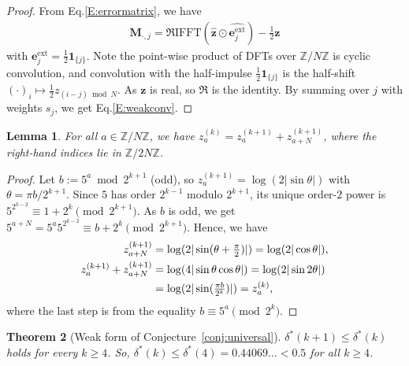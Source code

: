 \documentclass[11pt,a4paper]{article}
\theoremstyle{plain}
\newtheorem{theorem}{Theorem}[section]
\newtheorem{lemma}[theorem]{Lemma}
\theoremstyle{definition}
\theoremstyle{remark}
\newcommand{\Z}{\mathbb{Z}}
\begin{document}
\begin{proof}
From Eq.\eqref{E:errormatrix}, we have 
\begin{align}
\mathbf{M}_{\cdot,j}=\Re\mathrm{IFFT}(\hat{\mathbf z}\odot\widehat{\mathbf e_j^{\mathrm{ext}}})-\tfrac{1}{2}\mathbf{z}
\label{EMocd}
\end{align}
with $\mathbf{e}_j^{\mathrm{ext}}=\tfrac{1}{2}\mathbf{1}_{\{j\}}$. Note the point-wise product of DFTs over $\Z/N\Z$ is cyclic convolution, and convolution with the half-impulse $\tfrac{1}{2}\mathbf{1}_{\{j\}}$ is the half-shift $(\cdot)_i\mapsto\tfrac{1}{2}z_{(i-j)\bmod N}$. As $\mathbf{z}$ is real, so $\Re$ is the identity. By summing over $j$ with weights $s_j$, we get Eq.\eqref{E:weakconv}.
\end{proof}

\begin{lemma}\label{lem:fold}
For all $a\in\Z/N\Z$, we have $z^{(k)}_a=z^{(k+1)}_a+z^{(k+1)}_{a+N}$, where the right-hand indices lie in $\Z/2N\Z$.

\end{lemma}

\begin{proof}
Let $b:=5^a\bmod 2^{k+1}$ (odd), so $z^{(k+1)}_a=\log(2|\sin\theta|)$ with $\theta=\pi b/2^{k+1}$. Since $5$ has order $2^{k-1}$ modulo $2^{k+1}$, its unique order-$2$ power is $5^{2^{k-2}}\equiv 1+2^k\pmod{2^{k+1}}$. As $b$ is odd, we get $5^{a+N}=5^a5^{2^{k-2}}\equiv b+2^k\pmod{2^{k+1}}$. Hence, we have 
\begin{align}
z^{(k+1)}_{a+N}&=\log(2|\sin(\theta+\tfrac{\pi}{2})|) 
=\log(2|\cos\theta|),
\\
z^{(k+1)}_a+z^{(k+1)}_{a+N}&=\log(4|\sin\theta\cos\theta|)
  =\log(2|\sin2\theta|)
  \notag\\
 &=\log(2|\sin(\tfrac{\pi b}{2^k})|)=z^{(k)}_a,
\end{align}
where the last step is from the equality $b\equiv 5^a\pmod{2^k}$.
\end{proof}

\begin{theorem}[Weak form of Conjecture~\ref{conj:universal}]
\label{T:weak}
$\delta^*(k+1)\le\delta^*(k)$ holds for every $k\ge 4$. So, $\delta^*(k)\le\delta^*(4)=0.44069\ldots<0.5$ for all $k\ge4$.

\end{theorem}
\end{document}
